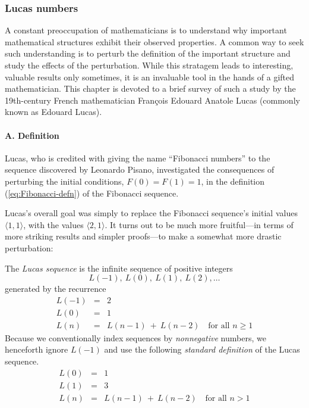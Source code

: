 \subsubsection{Lucas numbers}
\label{sec:Lucas-numbers}

A constant preoccupation of mathematicians is to understand why
important mathematical structures exhibit their observed properties.
A common way to seek such understanding is to perturb the definition
of the important structure and study the effects of the perturbation.
While this stratagem leads to interesting, valuable results only
sometimes, it is an invaluable tool in the hands of a gifted
mathematician.  This chapter is devoted to a brief survey of such a
study by the 19th-century French mathematician Fran\c{c}ois Edouard
Anatole Lucas (commonly known as Edouard Lucas).

\paragraph{\small\sf A. Definition}

Lucas, who is credited with giving the name ``Fibonacci numbers'' to
the sequence discovered by Leonardo Pisano,
investigated the consequences of perturbing the initial conditions,
$F(0) = F(1) = 1$, in the definition (\ref{eq:Fibonacci-defn}) of the
Fibonacci sequence.

Lucas's overall goal was simply to replace the Fibonacci sequence's
initial values $\langle 1,1 \rangle$, with the values $\langle 2,1
\rangle$.  It turns out to be much more fruitful---in terms of more
striking results and simpler proofs---to make a somewhat more drastic
perturbation:

The {\it Lucas sequence}  is the
infinite sequence of positive integers
\[ L(-1), \ L(0), \ L(1), \ L(2), \ldots \]
generated by the recurrence
\begin{eqnarray}
\nonumber
L(-1) & = & 2 \\
\label{eq:Lucas-defn-1}
L(0) & = & 1 \\
\nonumber
L(n) & = & L(n-1) \ + \ L(n-2) \ \ \ \mbox{ for all } n \geq 1
\end{eqnarray}
Because we conventionally index sequences by {\em nonnegative}
numbers, we henceforth ignore $L(-1)$ and use the following {\em
  standard definition} of the Lucas sequence.
\begin{eqnarray}
\nonumber
L(0) & = & 1 \\
\label{eq:Lucas-defn-2}
L(1) & = & 3 \\
\nonumber
L(n) & = & L(n-1) \ + \ L(n-2) \ \ \ \mbox{ for all } n > 1
\end{eqnarray}

